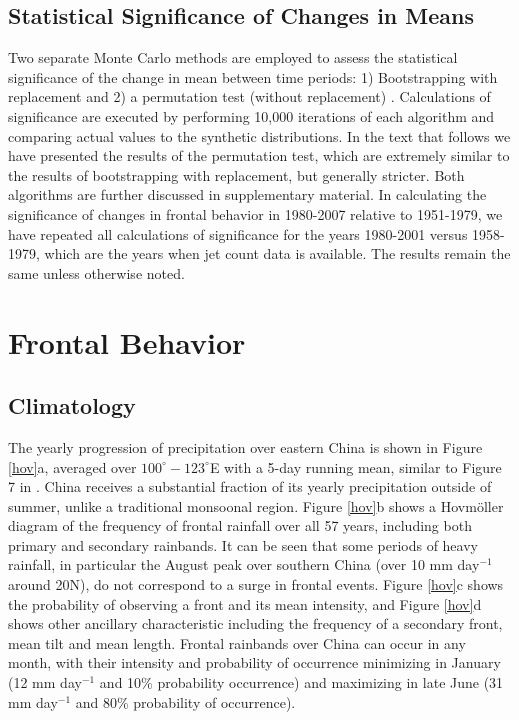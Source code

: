 \documentclass[draft,grl]{AGUTeX}
\begin{document}
\begin{article}
\subsection{Statistical Significance of Changes in Means}

	Two separate Monte Carlo methods are employed to assess the statistical significance of the change in mean between time periods: 1) Bootstrapping with replacement and 2) a permutation test (without replacement) \citep{Good2005}. Calculations of significance are executed by performing 10,000 iterations of each algorithm and comparing actual values to the synthetic distributions. In the text that follows we have presented the results of the permutation test, which are extremely similar to the results of bootstrapping with replacement, but generally stricter. Both algorithms are further discussed in supplementary material. In calculating the significance of changes in frontal behavior in 1980-2007 relative to 1951-1979, we have repeated all calculations of significance for the years 1980-2001 versus 1958-1979, which are the years when jet count data is available. The results remain the same unless otherwise noted.


\section{Frontal Behavior}	
	
\subsection{Climatology}	

	The yearly progression of precipitation over eastern China is shown in Figure \ref{hov}a, averaged over $100^\circ-123^\circ$E with a 5-day running mean, similar to Figure 7 in \citet{Ding2005}. China receives a substantial fraction of its yearly precipitation outside of summer, unlike a traditional monsoonal region. Figure \ref{hov}b shows a Hovm\"oller diagram of the frequency of frontal rainfall over all 57 years, including both primary and secondary rainbands. It can be seen that some periods of heavy rainfall, in particular the August peak over southern China (over 10 mm day$^{-1}$ around 20\textdegree N), do not correspond to a surge in frontal events. Figure \ref{hov}c shows the probability of observing a front and its mean intensity, and Figure \ref{hov}d shows other ancillary characteristic including the frequency of a secondary front, mean tilt and mean length. Frontal rainbands over China can occur in any month, with their intensity and probability of occurrence minimizing in January (12 mm day$^{-1}$ and 10\% probability occurrence) and maximizing in late June (31 mm day$^{-1}$ and 80\% probability of occurrence).
	

\end{article}
\end{document}
